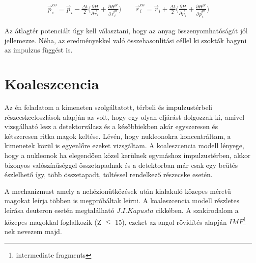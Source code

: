 \documentclass[a4paper,12pt]{article}
\begin{document}
\vspace{5mm}

\begin{gather}
	\vec{p}^{co}_{i} = \vec{p}_{i} - \frac{\Delta t}{2} \Big(\frac{\partial H}{\partial \vec{r}_{i}} + \frac{\partial H^{pr}}{\partial \vec{r}_{i}^{pr}} \Big) \quad \quad \vec{r}^{co}_{i} = \vec{r}_{i} + \frac{\Delta t}{2} \Big( \frac{\partial H}{\partial \vec{p}_{i}} + \frac{\partial H^{pr}}{\partial \vec{p}_{i}^{pr}} \Big)
\end{gather}

\vspace{5mm}

\par Az átlagtér potenciált úgy kell választani, hogy az anyag összenyomhatóságát jól jellemezze. Néha, az eredményekkel való összehasonlítási céllel ki szokták hagyni az impulzus függést is.

\vspace{5mm}

\section{ Koaleszcencia}

\vspace{5mm}

\par Az én feladatom a kimeneten szolgáltatott, térbeli és impulzustérbeli részecskeeloszlások alapján az volt, hogy egy olyan eljárást dolgozzak ki, amivel vizsgálható lesz a detektorválasz és a későbbiekben akár egyszeresen és kétszeresen ritka magok keltése. Lévén, hogy nukleonokra koncentráltam, a kimenetek közül is egyenlőre ezeket vizsgáltam. A koaleszcencia modell lényege, hogy a nukleonok ha elegendően közel kerülnek egymáshoz impulzustérben, akkor bizonyos valószínűséggel összetapadnak és a detektorban már csak egy beütés észlelhető így, több összetapadt, töltéssel rendelkező részecske esetén.

\vspace{5mm}

\par A mechanizmust amely a nehézionütközések után kialakuló közepes méretű magokat leírja többen is megpróbáltak leírni. A koaleszcencia modell részletes leírása deuteron esetén megtalálható $J. I. Kapusta$ cikkében. A szakirodalom a közepes magokkal foglalkozik (Z $\leq$ 15), ezeket az angol rövidítés alapján $IMF$\footnote{intermediate fragments}-nek nevezem majd. 

\vspace{5mm}
\end{document}
